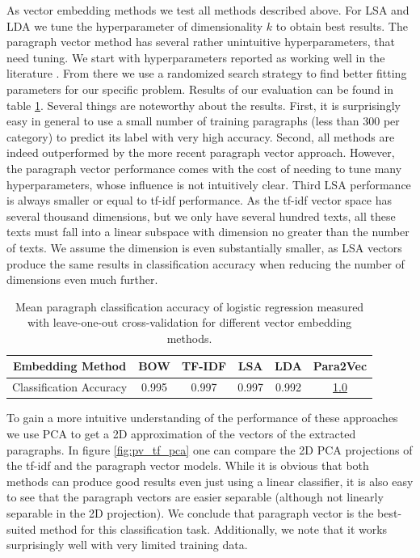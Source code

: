 As vector embedding methods we test all methods described above. For LSA and LDA we tune the hyperparameter of dimensionality $k$ to obtain best results. The paragraph vector method has several rather unintuitive hyperparameters, that need tuning. We start with hyperparameters reported as working well in the literature \citep{Lau2016}. From there we use a randomized search strategy to find better fitting parameters for our specific problem. Results of our evaluation can be found in table \ref{table:para_class_acc}. Several things are noteworthy about the results. First, it is surprisingly easy in general to use a small number of training paragraphs (less than 300 per category) to predict its label with very high accuracy. Second, all methods are indeed outperformed by the more recent paragraph vector approach. However, the paragraph vector performance comes with the cost of needing to tune many hyperparameters, whose influence is not intuitively clear. Third LSA performance is always smaller or equal to tf-idf performance. As the tf-idf vector space has several thousand dimensions, but we only have several hundred texts, all these texts must fall into a linear subspace with dimension no greater than the number of texts. We assume the dimension is even substantially smaller, as LSA vectors produce the same results in classification accuracy when reducing the number of dimensions even much further.
\begin{table}[h]
	\begin{tabular}{|c||c|c|c|c|c|}
		\hline 
		Embedding Method & BOW & TF-IDF & LSA & LDA  & Para2Vec\tabularnewline
		\hline 
		\hline 
		Classification Accuracy & 0.995 & 0.997 & 0.997 & 0.992 & \underline{1.0}\tabularnewline
		\hline 
	\end{tabular}
	\caption{Mean paragraph classification accuracy of logistic regression measured with leave-one-out cross-validation for different vector embedding methods.}
	\label{table:para_class_acc}
\end{table}

To gain a more intuitive understanding of the performance of these approaches we use PCA to get a 2D approximation of the vectors of the extracted paragraphs. In figure \ref{fig:pv_tf_pca} one can compare the 2D PCA projections of the tf-idf and the paragraph vector models. While it is obvious that both methods can produce good results even just using a linear classifier, it is also easy to see that the paragraph vectors are easier separable (although not linearly separable in the 2D projection). We conclude that paragraph vector is the best-suited method for this classification task. Additionally, we note that it works surprisingly well with very limited training data.


